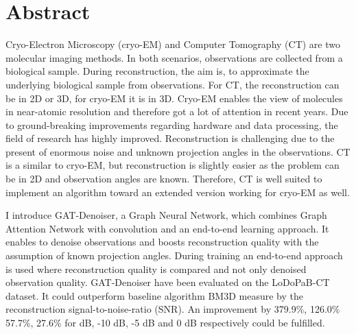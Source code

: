 \chapter{Abstract}


Cryo-Electron Microscopy (cryo-EM) and Computer Tomography (CT) 
are two molecular imaging methods.
In both scenarios, observations are collected from a biological sample.
During reconstruction, the aim is, to approximate the underlying biological sample from observations.
For CT, the reconstruction can be in 2D or 3D, for cryo-EM it is in 3D.
Cryo-EM enables the view of molecules in near-atomic resolution and therefore got a lot of attention in recent years.
Due to ground-breaking improvements regarding hardware and data processing, the field of research
has highly improved.
Reconstruction is challenging due to the present of enormous noise and unknown projection angles in the observations.
CT is a similar to cryo-EM, but reconstruction is slightly easier
as the problem can be in 2D and observation angles are known. 
Therefore, CT is well suited to implement an algorithm toward an extended version working for cryo-EM as well.

I introduce GAT-Denoiser, a Graph Neural Network, which combines Graph Attention Network with convolution 
and an end-to-end learning approach. 
It enables to denoise observations and boosts reconstruction quality with the assumption of known projection angles.
During training an end-to-end approach is used where reconstruction quality is compared and not only
denoised observation quality.
GAT-Denoiser have been evaluated on the LoDoPaB-CT~\cite{lodopab-dataset} dataset.
It could outperform baseline algorithm BM3D measure by the reconstruction
signal-to-noise-ratio (SNR). An improvement by 379.9\%, 126.0\% 57.7\%, 27.6\% for  dB, -10 dB, -5 dB and 0 dB respectively
could be fulfilled. 

